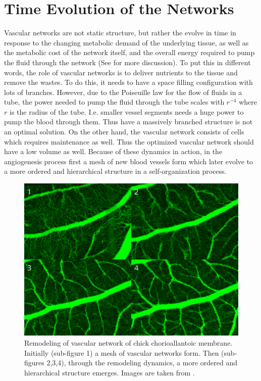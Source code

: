 \documentclass[10pt,a4paper,twocolumn]{article}
\begin{document}
	
	
	\section{Time Evolution of the Networks}
	Vascular networks are not static structure, but rather the evolve in time in response to the changing metabolic demand of the underlying tissue, as well as the metabolic cost of the network itself, and the overall energy required to pump the fluid through the network (See  \cite{Pries2010,Secomb2012,Pries2014,Ouarne2021} for more discussion). To put this in different words, the role of vascular networks is to deliver nutrients to the tissue and remove the wastes. To do this, it needs to have a space filling configuration with lots of branches. However, due to the Poiseuille law for the flow of fluids in a tube, the power needed to pump the fluid through the tube scales with $ r^{-4} $ where $ r $ is the radius of the tube. I.e. smaller vessel segments needs a huge power to pump the blood through them. Thus have a massively branched structure is not an optimal solution. On the other hand, the vascular network consists of cells which requires maintenance as well. Thus the optimized vascular network should have a low volume as well. Because of these dynamics in action, in the angiogenesis process first a mesh of new blood vessels form which later evolve to a more ordered and hierarchical structure in a self-organization process.
	
	
	\begin{figure}
		\centering
		\includegraphics[width=\linewidth]{images/remodeling2}
		\caption{Remodeling of vascular network of chick chorioallantoic membrane. Initially (sub-figure 1) a mesh of vascular networks form. Then (sub-figures 2,3,4), through the remodeling dynamics, a more ordered and hierarchical structure emerges. Images are taken from \cite{Richard2018}.}
		\label{fig:remodeling1}
	\end{figure}
	
\end{document}
